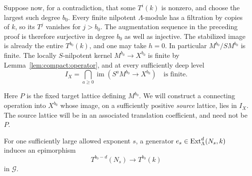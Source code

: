 Suppose now, for a contradiction, that some $T^i(k)$ is nonzero, and
choose the largest such degree $b_0$.  Every finite nilpotent
$\Lambda$-module has a filtration by copies of $k$, so its $T^j$
vanishes for $j>b_0$.  The augmentation sequence in the preceding
proof is therefore surjective in degree $b_0$ as well as injective.
The stabilized image is already the entire $T^{b_0}(k)$, and one may
take $h=0$.  In particular $M^{b_0}/SM^{b_0}$ is finite.  The
locally $S$-nilpotent kernel $M^{b_0}\to X^{b_0}$ is finite by
Lemma~\ref{lem:compact:operator}, and at every sufficiently deep level
\begin{equation}\label{eq:compact:top-finite-intersection}
 I_X=\bigcap_{a\geq0}
       \operatorname{im}(S^aM^{b_0}\longrightarrow X^{b_0})
 \quad\text{is finite}.
\end{equation}

Here $P$ is the fixed target lattice defining $M^{b_0}$. We will
construct a connecting operation into $X^{b_0}$ whose image, on a
sufficiently positive \emph{source} lattice, lies in $I_X$. The source
lattice will be in an associated translation coefficient, and need
not be $P$.

\begin{lemma}\label{lem:compact:koszul-edge}
For one sufficiently large allowed exponent $s$, a generator
$e_s\in\operatorname{Ext}^d_\Lambda(N_s,k)$ induces an epimorphism
\[
             T^{b_0-d}(N_s)\longrightarrow T^{b_0}(k)
\]
in $\mathscr G$.
\end{lemma}

